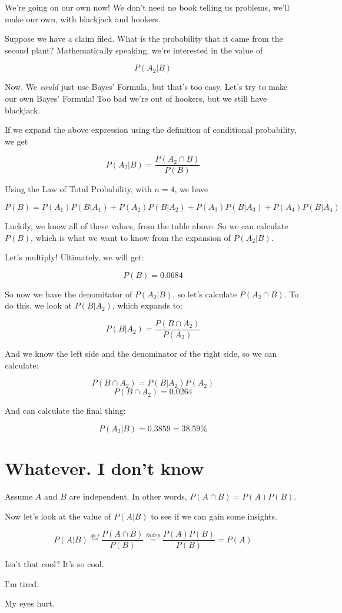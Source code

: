 \documentclass{article}
\begin{document}
We're going on our own now! We don't need no book telling us problems,
we'll make our own, with blackjack and hookers.

Suppose we have a claim filed. What is the probability that it came
from the second plant? Mathematically speaking, we're interested in
the value of

\[
P(A_2|B)
\]

Now. We \textit{could} just use Bayes' Formula, but that's too
easy. Let's try to make our own Bayes' Formula! Too bad we're out of
hookers, but we still have blackjack.

If we expand the above expression using the definition of conditional
probability, we get

\[
P(A_2|B)=\dfrac{P(A_2\cap B)}{P(B)}
\]

Using the Law of Total Probability, with $n=4$, we have

\[
P(B)
=
P(A_1)P(B|A_1) +
P(A_2)P(B|A_2) +
P(A_3)P(B|A_3) +
P(A_4)P(B|A_4)
\]

Luckily, we know all of these values, from the table above. So we can
calculate $P(B)$, which is what we want to know from the expansion of
$P(A_2|B)$.

Let's multiply! Ultimately, we will get:

\[
P(B)=0.0684
\]

So now we have the denomitator of $P(A_2|B)$, so let's calculate
$P(A_2\cap B)$. To do this, we look at $P(B|A_2)$, which expands to:

\[
P(B|A_2)=\dfrac{P(B\cap A_2)}{P(A_2)}
\]

And we know the left side and the denominator of the right side, so we
can calculate:

\[
P(B\cap A_2)=P(B|A_2)P(A_2)
\] \[
P(B\cap A_2)=0.0264
\]

And can calculate the final thing:

\[
P(A_2|B)=0.3859=38.59\%
\]

\section*{Whatever. I don't know}

Assume $A$ and $B$ are independent. In other words,
$P(A\cap{}B)=P(A)P(B)$.

Now let's look at the value of $P(A|B)$ to see if we can gain some
insights.

\[
P(A|B)\overset{def}{=}\dfrac{P(A\cap B)}{P(B)}\overset{indep}{=}\dfrac{P(A)P(B)}{P(B)}=P(A)
\]

Isn't that cool? It's so cool.

I'm tired.

My eyes hurt.
\end{document}
